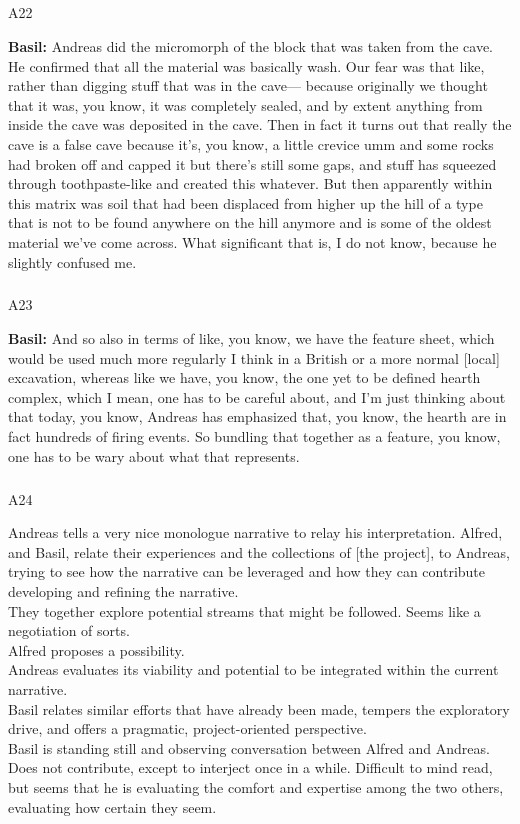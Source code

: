 \documentclass[
  canadian,
]{article}
\makeatletter
\let\oldsubparagraph\subparagraph
\renewcommand{\subparagraph}{
    \@ifstar
      \xxxSubParagraphStar
      \xxxSubParagraphNoStar
  }
\newcommand{\xxxSubParagraphStar}[1]{\oldsubparagraph*{#1}\mbox{}}
\newcommand{\xxxSubParagraphNoStar}[1]{\oldsubparagraph{#1}\mbox{}}
\makeatother
\begin{document}
\subparagraph{A22}\label{sec-A22}

\textbf{Basil:} Andreas did the micromorph of the block that was taken
from the cave. He confirmed that all the material was basically wash.
Our fear was that like, rather than digging stuff that was in the
cave--- because originally we thought that it was, you know, it was
completely sealed, and by extent anything from inside the cave was
deposited in the cave. Then in fact it turns out that really the cave is
a false cave because it's, you know, a little crevice umm and some rocks
had broken off and capped it but there's still some gaps, and stuff has
squeezed through toothpaste-like and created this whatever. But then
apparently within this matrix was soil that had been displaced from
higher up the hill of a type that is not to be found anywhere on the
hill anymore and is some of the oldest material we've come across. What
significant that is, I do not know, because he slightly confused me.

\subparagraph{A23}\label{sec-A23}

\textbf{Basil:} And so also in terms of like, you know, we have the
feature sheet, which would be used much more regularly I think in a
British or a more normal {[}local{]} excavation, whereas like we have,
you know, the one yet to be defined hearth complex, which I mean, one
has to be careful about, and I'm just thinking about that today, you
know, Andreas has emphasized that, you know, the hearth are in fact
hundreds of firing events. So bundling that together as a feature, you
know, one has to be wary about what that represents.

\subparagraph{A24}\label{sec-A24}

Andreas tells a very nice monologue narrative to relay his
interpretation. Alfred, and Basil, relate their experiences and the
collections of {[}the project{]}, to Andreas, trying to see how the
narrative can be leveraged and how they can contribute developing and
refining the narrative.\\
They together explore potential streams that might be followed. Seems
like a negotiation of sorts.\\
Alfred proposes a possibility.\\
Andreas evaluates its viability and potential to be integrated within
the current narrative.\\
Basil relates similar efforts that have already been made, tempers the
exploratory drive, and offers a pragmatic, project-oriented
perspective.\\
Basil is standing still and observing conversation between Alfred and
Andreas. Does not contribute, except to interject once in a while.
Difficult to mind read, but seems that he is evaluating the comfort and
expertise among the two others, evaluating how certain they seem.
\end{document}
